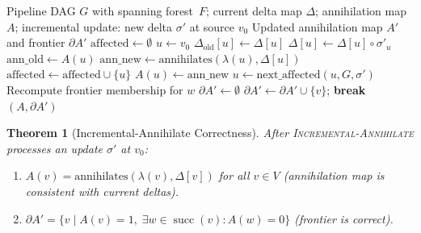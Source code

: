 \documentclass[11pt,a4paper]{article}
\newtheorem{theorem}{Theorem}[section]
\theoremstyle{definition}
\newcommand{\ann}{\mathrm{annihilates}}
\DeclareMathOperator{\pred}{pred}
\DeclareMathOperator{\succ}{succ}
\begin{document}
\begin{algorithm}[htbp]
\caption{\textsc{Incremental-Annihilate}: Maintain Annihilation Under Updates}
\label{alg:incremental-annihilate}
\begin{algorithmic}[1]
\Require Pipeline DAG $G$ with spanning forest~$F$;
  current delta map $\Delta$; annihilation map $A$;
  incremental update: new delta $\sigma'$ at source $v_0$
\Ensure Updated annihilation map $A'$ and frontier $\partial A'$
\State $\mathrm{affected} \gets \emptyset$
\State {}
\State $u \gets v_0$
  \State $\Delta_{\mathrm{old}}[u] \gets \Delta[u]$
  \State $\Delta[u] \gets \Delta[u] \circ \sigma'_u$
  \State $\mathrm{ann\_old} \gets A(u)$
  \State $\mathrm{ann\_new} \gets \ann(\lambda(u), \Delta[u])$
    \State $\mathrm{affected} \gets \mathrm{affected} \cup \{u\}$
    \State $A(u) \gets \mathrm{ann\_new}$
  \EndIf
  \State $u \gets \mathrm{next\_affected}(u, G, \sigma')$
\EndWhile
\State {}
  \For{$w \in \succ(v) \cup \pred(v)$}
    \State Recompute frontier membership for $w$
  \EndFor
\EndFor
\State {}
\State $\partial A' \gets \emptyset$
    \For{$w \in \succ(v)$}
        $\partial A' \gets \partial A' \cup \{v\}$; \textbf{break}
      \EndIf
    \EndFor
  \EndIf
\EndFor
\State \Return $(A, \partial A')$
\end{algorithmic}
\end{algorithm}

\begin{theorem}[Incremental-Annihilate Correctness]\label{thm:inc-ann-correct}
After \textsc{Incremental-Annihilate} processes an update $\sigma'$ at $v_0$:
\begin{enumerate}[nosep]
  \item $A(v) = \ann(\lambda(v), \Delta[v])$ for all $v \in V$
    (annihilation map is consistent with current deltas).
  \item $\partial A' = \{v \mid A(v) = 1,\; \exists w \in \succ(v): A(w) = 0\}$
    (frontier is correct).
\end{enumerate}
\end{theorem}
\end{document}
